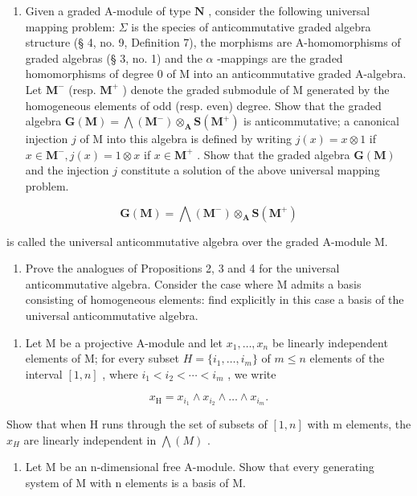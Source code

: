 \begin{enumerate}
\def\labelenumi{(\alph{enumi})}
\setcounter{enumi}{1}
\tightlist
\item
  Given a graded A-module of type \(\mathbf{N}\) , consider the following universal mapping problem: \(\Sigma\) is the species of anticommutative graded algebra structure (§ 4, no. 9, Definition 7), the morphisms are A-homomorphisms of graded algebras (§ 3, no. 1) and the \(\alpha\) -mappings are the graded homomorphisms of degree 0 of M into an anticommutative graded A-algebra. Let \(\mathbf{M}^{-}\) (resp. \(\mathbf{M}^{+}\) ) denote the graded submodule of M generated by the homogeneous elements of odd (resp. even) degree. Show that the graded algebra \(\mathbf{G}(\mathbf{M}) = \bigwedge (\mathbf{M}^{-}) \otimes_{\mathbf{A}} \mathbf{S}(\mathbf{M}^{+})\) is anticommutative; a canonical injection \(j\) of M into this algebra is defined by writing \(j(x) = x \otimes 1\) if \(x \in \mathbf{M}^{-}, j(x) = 1 \otimes x\) if \(x \in \mathbf{M}^{+}\) . Show that the graded algebra \(\mathbf{G}(\mathbf{M})\) and the injection \(j\) constitute a solution of the above universal mapping problem.
\end{enumerate}

\[
\mathbf {G} (\mathbf {M}) = \bigwedge (\mathbf {M} ^ {-}) \otimes_ {\mathbf {A}} \mathbf {S} (\mathbf {M} ^ {+})
\]

is called the universal anticommutative algebra over the graded A-module M.

\begin{enumerate}
\def\labelenumi{(\alph{enumi})}
\setcounter{enumi}{2}
\tightlist
\item
  Prove the analogues of Propositions 2, 3 and 4 for the universal anticommutative algebra. Consider the case where M admits a basis consisting of homogeneous elements: find explicitly in this case a basis of the universal anticommutative algebra.
\end{enumerate}

\begin{enumerate}
\def\labelenumi{\arabic{enumi}.}
\setcounter{enumi}{13}
\tightlist
\item
  Let M be a projective A-module and let \(x_{1}, \ldots, x_{n}\) be linearly independent elements of M; for every subset \(H = \{i_{1}, \ldots, i_{m}\}\) of \(m \leqslant n\) elements of the interval \([1, n]\) , where \(i_{1} < i_{2} < \cdots < i_{m}\) , we write
\end{enumerate}

\[
x _ {\mathrm{H}} = x _ {i _ {1}} \wedge x _ {i _ {2}} \wedge \dots \wedge x _ {i _ {m}}.
\]

Show that when H runs through the set of subsets of \([1, n]\) with m elements, the \(x_{H}\) are linearly independent in \(\bigwedge(M)\) .

\begin{enumerate}
\def\labelenumi{\arabic{enumi}.}
\setcounter{enumi}{14}
\tightlist
\item
  Let M be an n-dimensional free A-module. Show that every generating system of M with n elements is a basis of M.
\end{enumerate}

